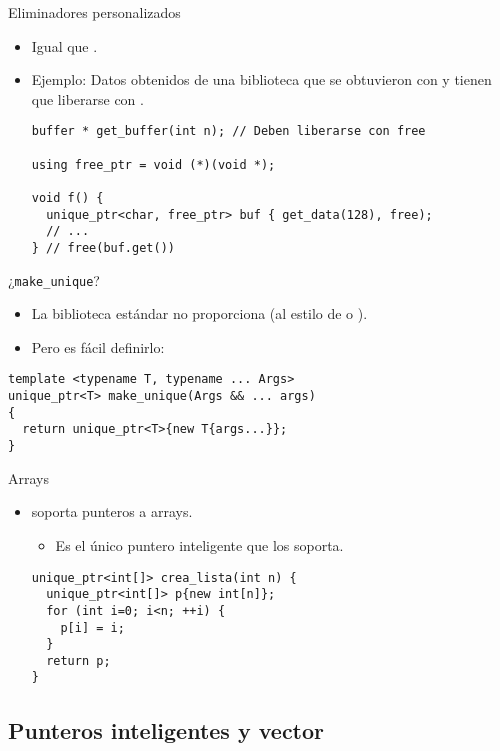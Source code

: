 \begin{frame}[fragile]{Eliminadores personalizados}
\begin{itemize}
  \item Igual que .
  \item Ejemplo: Datos obtenidos de una biblioteca que se obtuvieron con
         y tienen que liberarse con .
\begin{lstlisting}
buffer * get_buffer(int n); // Deben liberarse con free

using free_ptr = void (*)(void *);

void f() {
  unique_ptr<char, free_ptr> buf { get_data(128), free);
  // ...
} // free(buf.get())
\end{lstlisting}
\end{itemize}
\end{frame}

\begin{frame}[fragile]{¿\texttt{make\_unique}?}
\begin{itemize}
  \item La biblioteca estándar no proporciona  (al estilo de
         o ).
  \item Pero es fácil definirlo:
\end{itemize}
\begin{lstlisting}
template <typename T, typename ... Args>
unique_ptr<T> make_unique(Args && ... args)
{
  return unique_ptr<T>{new T{args...}};
}
\end{lstlisting}
\end{frame}

\begin{frame}[fragile]{Arrays}
\begin{itemize}
  \item {} soporta punteros a arrays.
     \begin{itemize}
       \item Es el único puntero inteligente que los soporta.
     \end{itemize}
\begin{lstlisting}
unique_ptr<int[]> crea_lista(int n) {
  unique_ptr<int[]> p{new int[n]};
  for (int i=0; i<n; ++i) {
    p[i] = i;
  }
  return p;
}
\end{lstlisting}
\end{itemize}
\end{frame}

\subsection{Punteros inteligentes y vector}

